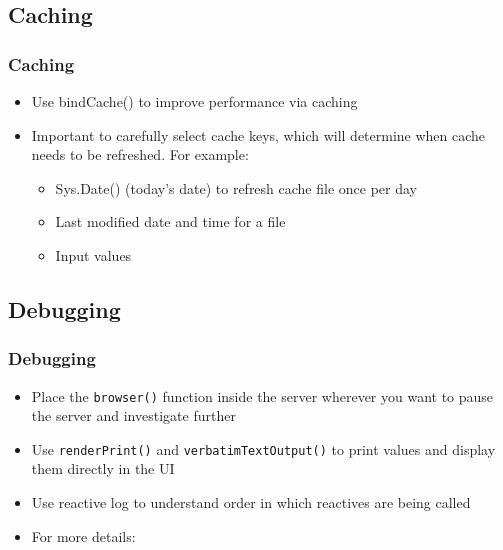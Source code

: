 \documentclass[
	11pt, %
]{beamer}
\begin{document}
\subsection{Caching}

\begin{frame}
	\frametitle{Caching}
	
	\begin{itemize}
		\item Use bindCache() to improve performance via caching
		\item Important to carefully select cache keys, which will determine when cache needs to be refreshed. For example:
	\begin{itemize}
		\item Sys.Date() (today's date) to refresh cache file once per day
		\item Last modified date and time for a file
		\item Input values
	\end{itemize}
	\end{itemize}
\end{frame}



\subsection{Debugging}

\begin{frame}
	\frametitle{Debugging}
	
	\begin{itemize}
	\item Place the \texttt{browser()} function inside the server wherever you want to pause the server and investigate further
	\item Use \texttt{renderPrint()} and \texttt{verbatimTextOutput()} to print values and display them directly in the UI
	\item Use reactive log to understand order in which reactives are being called
	\item For more details: \href{https://shiny.posit.co/r/articles/improve/debugging/}{\color{blue}{https://shiny.posit.co/r/articles/improve/debugging/}} 

	\end{itemize}
	
\end{frame}
\end{document}
